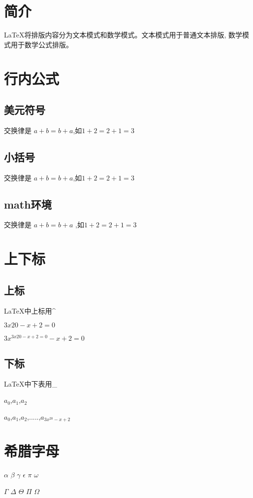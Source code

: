 \documentclass{article}
\begin{document}
	\section{简介}
	\LaTeX{}将排版内容分为文本模式和数学模式。文本模式用于普通文本排版, 数学模式用于数学公式排版。
	\section{行内公式}
	\subsection{美元符号}
	交换律是 $a+b=b+a$,如$1+2=2+1=3$
	\subsection{小括号}
	交换律是 \(a+b=b+a\),如\(1+2=2+1=3\)
	\subsection{math环境}
	交换律是 \begin{math}a+b=b+a\end{math}
	,如\begin{math}1+2=2+1=3\end{math}
	\section{上下标}
	\subsection{上标}
	\LaTeX{}中上标用\^{} 
	
	$3x{20}-x+2=0$
	
	$3x^{3x{20}-x+2=0}-x+2=0$
	\subsection{下标}
	
	\LaTeX{}中下表用\_{}
	
	$a_0$,$a_1$,$a_2$
	
	$a_0$,$a_1$,$a_2$,.....,$a_{3x^{20}-x+2}$
	
	\section{希腊字母}
	$\alpha$
	$\beta$
	$\gamma$
	$\epsilon$
	$\pi$
	$\omega$
	
	$\Gamma$
	$\Delta$
	$\Theta$
	$\Pi$  %
	$\Omega$
\end{document}

